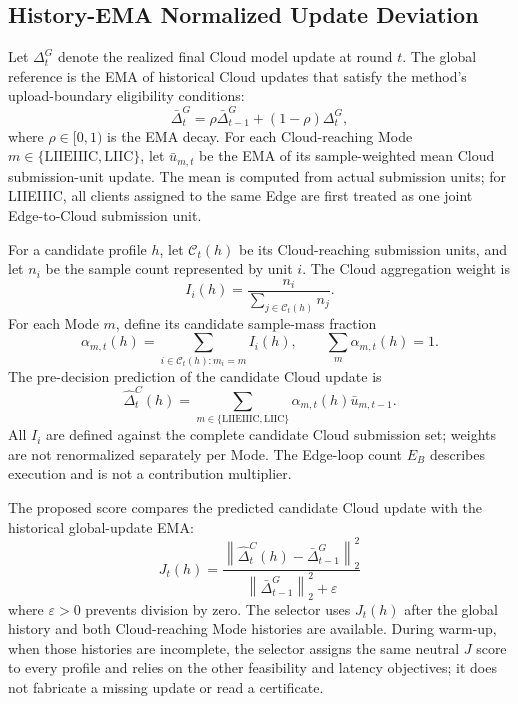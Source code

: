 \subsection{History-EMA Normalized Update Deviation}
\label{subsec:history-ema-j}

Let $\Delta^G_t$ denote the realized final Cloud model update at round $t$.
The global reference is the EMA of historical Cloud updates that satisfy the
method's upload-boundary eligibility conditions:
\begin{equation}
\bar{\Delta}^{G}_{t}
=\rho\bar{\Delta}^{G}_{t-1}+(1-\rho)\Delta^{G}_{t},
\label{eq:history-global-ema}
\end{equation}
where $\rho\in[0,1)$ is the EMA decay. For each Cloud-reaching Mode
$m\in\{\mathrm{LIIEIIIC},\mathrm{LIIC}\}$, let $\bar u_{m,t}$ be the EMA of
its sample-weighted mean Cloud submission-unit update. The mean is computed
from actual submission units; for LIIEIIIC, all clients assigned to the same
Edge are first treated as one joint Edge-to-Cloud submission unit.

For a candidate profile $h$, let $\mathcal C_t(h)$ be its Cloud-reaching
submission units, and let $n_i$ be the sample count represented by unit $i$.
The Cloud aggregation weight is
\begin{equation}
I_i(h)=\frac{n_i}{\sum_{j\in\mathcal C_t(h)}n_j}.
\label{eq:history-cloud-sample-weights}
\end{equation}
For each Mode $m$, define its candidate sample-mass fraction
\begin{equation}
\alpha_{m,t}(h)=\sum_{i\in\mathcal C_t(h):m_i=m}I_i(h),
\qquad \sum_m\alpha_{m,t}(h)=1.
\label{eq:history-mode-mass}
\end{equation}
The pre-decision prediction of the candidate Cloud update is
\begin{equation}
\widehat{\Delta}^{C}_{t}(h)=
\sum_{m\in\{\mathrm{LIIEIIIC},\mathrm{LIIC}\}}
\alpha_{m,t}(h)\bar u_{m,t-1}.
\label{eq:history-predicted-cloud-update}
\end{equation}
All $I_i$ are defined against the complete candidate Cloud submission set;
weights are not renormalized separately per Mode. The Edge-loop count $E_B$
describes execution and is not a contribution multiplier.

The proposed score compares the predicted candidate Cloud update with the
historical global-update EMA:
\begin{equation}
\boxed{
J_t(h)=
\frac{\left\|\widehat{\Delta}^{C}_{t}(h)-\bar{\Delta}^{G}_{t-1}\right\|_2^2}
{\left\|\bar{\Delta}^{G}_{t-1}\right\|_2^2+\varepsilon}
}
\label{eq:history-ema-j}
\end{equation}
where $\varepsilon>0$ prevents division by zero. The selector uses $J_t(h)$
after the global history and both Cloud-reaching Mode histories are available.
During warm-up, when those histories are incomplete, the selector assigns the
same neutral $J$ score to every profile and relies on the other feasibility and
latency objectives; it does not fabricate a missing update or read a certificate.


